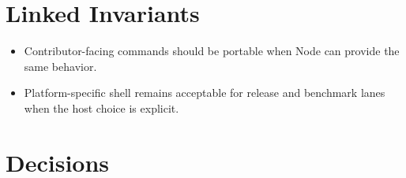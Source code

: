 \section{Linked Invariants}\label{record-206-linked-invariants}

\begin{itemize}
\tightlist
\item
  Contributor-facing commands should be portable when Node can provide the same behavior.
\item
  Platform-specific shell remains acceptable for release and benchmark lanes when the host choice is explicit.
\end{itemize}

\section{Decisions}\label{record-206-decisions}

